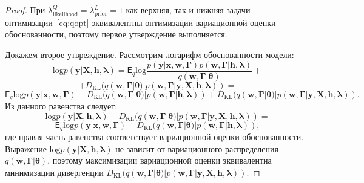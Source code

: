 \begin{proof}
При $\lambda^Q_\text{likelihood} = \lambda^L_\text{prior} = 1$ как верхняя, так и нижняя задачи оптимизации~\eqref{eq:qopt} эквивалентны оптимизации вариационной оценки обоснованности, поэтому первое утверждение выполняется.

Докажем второе утвреждение. Рассмотрим логарифм обоснованности модели: 
\[
\text{log} p(\mathbf{y}|\mathbf{X}, \mathbf{h}, \boldsymbol{\lambda}) = \mathsf{E}_q \text{log}\frac{p(\mathbf{y}|\mathbf{x}, \mathbf{w}, \boldsymbol{\Gamma})p(\mathbf{w}, \boldsymbol{\Gamma}|\mathbf{h}, \boldsymbol{\lambda})}{q(\mathbf{w}, \boldsymbol{\Gamma}| \boldsymbol{\theta})} +
\]
\[
+ {D}_\text{KL}(q(\mathbf{w}, \boldsymbol{\Gamma}|\boldsymbol{\theta})|p(\mathbf{w}, \boldsymbol{\Gamma}|\mathbf{y}, \mathbf{X}, \mathbf{h}, \boldsymbol{\lambda})) = 
\]
\[
 \mathsf{E}_q \text{log} p(\mathbf{y}|\mathbf{x}, \mathbf{w}, \boldsymbol{\Gamma}) -{D}_\text{KL}(q(\mathbf{w}, \boldsymbol{\Gamma}|\boldsymbol{\theta})|p(\mathbf{w}, \boldsymbol{\Gamma}|\mathbf{h}, \boldsymbol{\lambda})) + {D}_\text{KL}(q(\mathbf{w}, \boldsymbol{\Gamma}|\boldsymbol{\theta})|p(\mathbf{w}, \boldsymbol{\Gamma}|\mathbf{y}, \mathbf{X}, \mathbf{h}, \boldsymbol{\lambda})).
\]
Из данного равенства следует:
\[
\text{log} p(\mathbf{y}|\mathbf{X}, \mathbf{h}, \boldsymbol{\lambda}) - {D}_\text{KL}(q(\mathbf{w}, \boldsymbol{\Gamma}|\boldsymbol{\theta})|p(\mathbf{w}, \boldsymbol{\Gamma}|\mathbf{y}, \mathbf{X}, \mathbf{h}, \boldsymbol{\lambda})) =
\]
\[
    \mathsf{E}_q \text{log} p(\mathbf{y}|\mathbf{x}, \mathbf{w}, \boldsymbol{\Gamma}) -{D}_\text{KL}(q(\mathbf{w}, \boldsymbol{\Gamma}|\boldsymbol{\theta})|p(\mathbf{w}, \boldsymbol{\Gamma}|\mathbf{h}, \boldsymbol{\lambda})),
\]
где правая часть равенства соответствует вариационной оценки обоснованности. Выражение $\text{log} p(\mathbf{y}|\mathbf{X}, \mathbf{h}, \boldsymbol{\lambda})$ не зависит от вариационного распределения  $q(\mathbf{w}, \boldsymbol{\Gamma}|\boldsymbol{\theta})$, поэтому максимизации вариационной оценки эквивалентна минимизации дивергенции ${D}_\text{KL}(q(\mathbf{w}, \boldsymbol{\Gamma}|\boldsymbol{\theta})|p(\mathbf{w}, \boldsymbol{\Gamma}|\mathbf{y}, \mathbf{X}, \mathbf{h}, \boldsymbol{\lambda}))$.


\end{proof}
